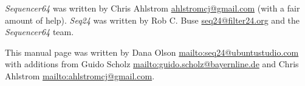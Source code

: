    \textsl{Sequencer64} was written by Chris Ahlstrom
   \href{mailto:ahlstromcj@gmail.com}{ahlstromcj@gmail.com}
   (with a fair amount of help).
   \textsl{Seq24} was written by Rob C. Buse
   \href{mailto:seq24@filter24.org}{seq24@filter24.org}
   and the \textsl{Sequencer64} team.

   This manual page was written by Dana Olson
   \url{mailto:seq24@ubuntustudio.com} with additions from Guido Scholz
   \url{mailto:guido.scholz@bayernline.de} and Chris Ahlstrom
   \url{mailto:ahlstromcj@gmail.com}.


